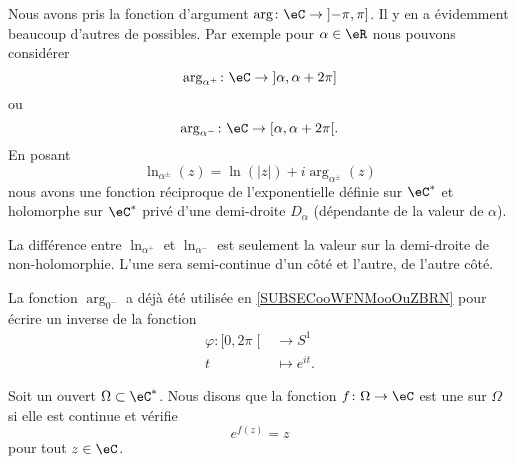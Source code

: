 \begin{normaltext}      \label{NORMooFCDOooFDzAjp}
	Nous avons pris la fonction d'argument \( \arg\colon \eC\to \mathopen] -\pi , \pi \mathclose]\). Il y en a évidemment beaucoup d'autres de possibles. Par exemple pour \( \alpha\in \eR\) nous pouvons considérer
	\begin{equation}        \label{EQooNKKDooOuJxXe}
		\arg_{\alpha^+}\colon \eC\to \mathopen] \alpha , \alpha+2\pi \mathclose]
	\end{equation}
	ou
	\begin{equation}
		\arg_{\alpha^-}\colon \eC\to \mathopen[ \alpha , \alpha+2\pi \mathclose[.
	\end{equation}
	En posant
	\begin{equation}
		\ln_{\alpha^{\pm}}(z)=\ln(| z |)+i\arg_{\alpha^{\pm}}(z)
	\end{equation}
	nous avons une fonction réciproque de l'exponentielle définie sur \( \eC^*\) et holomorphe sur \( \eC^*\) privé d'une demi-droite \( D_{\alpha}\) (dépendante de la valeur de \( \alpha\)).
\end{normaltext}

La différence entre \( \ln_{\alpha^+}\) et \( \ln_{\alpha^-}\) est seulement la valeur sur la demi-droite de non-holomorphie. L'une sera semi-continue d'un côté et l'autre, de l'autre côté.

\begin{remark}
	La fonction \( \arg_{0^-}\) a déjà été utilisée en \ref{SUBSECooWFNMooOuZBRN} pour écrire un inverse de la fonction
	\begin{equation}
		\begin{aligned}
			\varphi\colon \mathopen[ 0 , 2\pi \mathclose[ & \to S^1          \\
			t                                             & \mapsto  e^{it}.
		\end{aligned}
	\end{equation}
\end{remark}

\begin{definition}
	Soit un ouvert \( \Omega\subset \eC^*\). Nous disons que la fonction \( f\colon \Omega\to \eC\) est une  sur \( \Omega\) si elle est continue et vérifie
	\begin{equation}
		e^{f(z)}=z
	\end{equation}
	pour tout \( z\in \eC\).
\end{definition}

